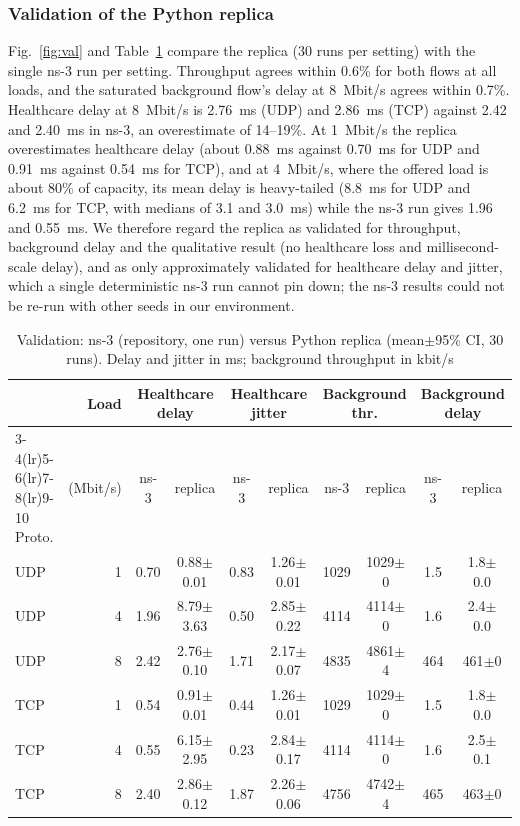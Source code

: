 \documentclass[10pt,twocolumn,letterpaper]{article}
\begin{document}
\subsubsection{Validation of the Python replica} Fig.~\ref{fig:val} and Table~\ref{tab:val} compare the replica (30 runs per setting) with the single ns-3 run per setting. Throughput agrees within 0.6\% for both flows at all loads, and the saturated background flow's delay at 8~Mbit/s agrees within 0.7\%. Healthcare delay at 8~Mbit/s is 2.76~ms (UDP) and 2.86~ms (TCP) against 2.42 and 2.40~ms in ns-3, an overestimate of 14--19\%. At 1~Mbit/s the replica overestimates healthcare delay (about 0.88~ms against 0.70~ms for UDP and 0.91~ms against 0.54~ms for TCP), and at 4~Mbit/s, where the offered load is about 80\% of capacity, its mean delay is heavy-tailed (8.8~ms for UDP and 6.2~ms for TCP, with medians of 3.1 and 3.0~ms) while the ns-3 run gives 1.96 and 0.55~ms. We therefore regard the replica as validated for throughput, background delay and the qualitative result (no healthcare loss and millisecond-scale delay), and as only approximately validated for healthcare delay and jitter, which a single deterministic ns-3 run cannot pin down; the ns-3 results could not be re-run with other seeds in our environment.

\begin{table}[!t]
\centering
\caption{Validation: ns-3 (repository, one run) versus Python replica (mean$\pm$95\% CI, 30 runs). Delay and jitter in ms; background throughput in kbit/s}
\label{tab:val}
\footnotesize
\setlength{\tabcolsep}{4pt}
\begin{tabular}{@{}lrcccccccc@{}}
\toprule
 & Load & \multicolumn{2}{c}{Healthcare delay} & \multicolumn{2}{c}{Healthcare jitter} & \multicolumn{2}{c}{Background thr.} & \multicolumn{2}{c}{Background delay}\\
\cmidrule(lr){3-4}\cmidrule(lr){5-6}\cmidrule(lr){7-8}\cmidrule(lr){9-10}
Proto. & (Mbit/s) & ns-3 & replica & ns-3 & replica & ns-3 & replica & ns-3 & replica\\
\midrule
UDP & 1 & 0.70 & 0.88$\pm$0.01 & 0.83 & 1.26$\pm$0.01 & 1029 & 1029$\pm$0 & 1.5 & 1.8$\pm$0.0\\
UDP & 4 & 1.96 & 8.79$\pm$3.63 & 0.50 & 2.85$\pm$0.22 & 4114 & 4114$\pm$0 & 1.6 & 2.4$\pm$0.0\\
UDP & 8 & 2.42 & 2.76$\pm$0.10 & 1.71 & 2.17$\pm$0.07 & 4835 & 4861$\pm$4 & 464 & 461$\pm$0\\
TCP & 1 & 0.54 & 0.91$\pm$0.01 & 0.44 & 1.26$\pm$0.01 & 1029 & 1029$\pm$0 & 1.5 & 1.8$\pm$0.0\\
TCP & 4 & 0.55 & 6.15$\pm$2.95 & 0.23 & 2.84$\pm$0.17 & 4114 & 4114$\pm$0 & 1.6 & 2.5$\pm$0.1\\
TCP & 8 & 2.40 & 2.86$\pm$0.12 & 1.87 & 2.26$\pm$0.06 & 4756 & 4742$\pm$4 & 465 & 463$\pm$0\\
\bottomrule
\end{tabular}
\end{table}
\end{document}

